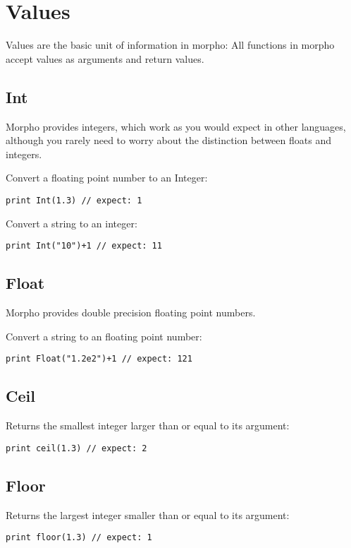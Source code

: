 \hypertarget{values}{%
\section{Values}\label{values}}

Values are the basic unit of information in morpho: All functions in
morpho accept values as arguments and return values.

\hypertarget{int}{%
\subsection{Int}\label{int}}

Morpho provides integers, which work as you would expect in other
languages, although you rarely need to worry about the distinction
between floats and integers.

Convert a floating point number to an Integer:

\begin{lstlisting}
print Int(1.3) // expect: 1
\end{lstlisting}

Convert a string to an integer:

\begin{lstlisting}
print Int("10")+1 // expect: 11
\end{lstlisting}

\hypertarget{float}{%
\subsection{Float}\label{float}}

Morpho provides double precision floating point numbers.

Convert a string to an floating point number:

\begin{lstlisting}
print Float("1.2e2")+1 // expect: 121
\end{lstlisting}

\hypertarget{ceil}{%
\subsection{Ceil}\label{ceil}}

Returns the smallest integer larger than or equal to its argument:

\begin{lstlisting}
print ceil(1.3) // expect: 2
\end{lstlisting}

\hypertarget{floor}{%
\subsection{Floor}\label{floor}}

Returns the largest integer smaller than or equal to its argument:

\begin{lstlisting}
print floor(1.3) // expect: 1
\end{lstlisting}
